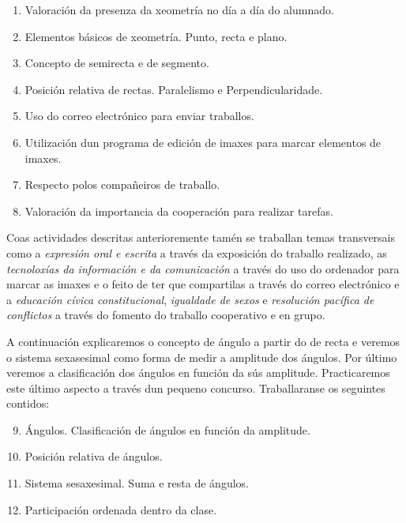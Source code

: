 \begin{enumerate}[label=\bfseries Con\arabic*, align=left, leftmargin=1.5cm]
    \item\label{con1} Valoración da presenza da xeometría no día a día do alumnado.
    \item\label{con2} Elementos básicos de xeometría. Punto, recta e plano.
    \item\label{con3} Concepto de semirecta e de segmento.
    \item\label{con4} Posición relativa de rectas. Paralelismo e Perpendicularidade.
    \item\label{con5} Uso do correo electrónico para enviar traballos.
    \item\label{con6} Utilización dun programa de edición de imaxes para marcar elementos de imaxes.
    \item\label{con7} Respecto polos compañeiros de traballo.
    \item\label{con8} Valoración da importancia da cooperación para realizar tarefas.
\end{enumerate}

Coas actividades descritas anterioremente tamén se traballan temas transversais como a \emph{expresión oral e escrita} a través da exposición do traballo realizado, as \emph{tecnoloxías da información e da comunicación} a través do uso do ordenador para marcar as imaxes e o feito de ter que compartilas a través do correo electrónico e a \emph{educación cívica constitucional}, \emph{igualdade de sexos} e \emph{resolución pacífica de conflictos} a través do fomento do traballo cooperativo e en grupo.

A continuación explicaremos o concepto de ángulo a partir do de recta e veremos o sistema sexasesimal como forma de medir a amplitude dos ángulos. Por último veremos a clasificación dos ángulos en función da sús amplitude. Practicaremos este último aspecto a través dun pequeno concurso. Traballaranse os seguintes contidos:

\begin{enumerate}[label=\bfseries Con\arabic*, align=left, leftmargin=1.5cm]
  \setcounter{enumi}{8}
  \item\label{con9} Ángulos. Clasificación de ángulos en función da amplitude.
  \item\label{con10} Posición relativa de ángulos.
  \item\label{con11} Sistema sesaxesimal. Suma e resta de ángulos.
  \item\label{con12} Participación ordenada dentro da clase.
\end{enumerate}

